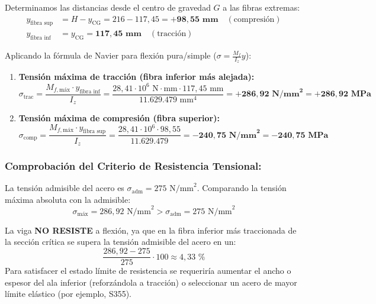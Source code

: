 Determinamos las distancias desde el centro de gravedad $G$ a las fibras extremas:
\begin{align}
    y_{\text{fibra sup}} & = H - y_{\text{CG}} = 216 - 117{,}45 = \mathbf{+98{,}55\text{ mm}} \quad (\text{compresión}) \\[4pt]
    y_{\text{fibra inf}} & = y_{\text{CG}} = \mathbf{117{,}45\text{ mm}} \quad (\text{tracción})
\end{align}

Aplicando la fórmula de Navier para flexión pura/simple ($\sigma = \frac{M_f}{I_z}y$):
\begin{enumerate}
    \item \textbf{Tensión máxima de tracción (fibra inferior más alejada):}
          \begin{equation}
              \sigma_{\text{trac}} = \frac{M_{f,\text{máx}} \cdot y_{\text{fibra inf}}}{I_z} = \frac{28{,}41 \cdot 10^6\text{ N}\cdot\text{mm} \cdot 117{,}45\text{ mm}}{11.629.479\text{ mm}^4} = \mathbf{+286{,}92\text{ N/mm}^2 = +286{,}92\text{ MPa}}
          \end{equation}
    \item \textbf{Tensión máxima de compresión (fibra superior):}
          \begin{equation}
              \sigma_{\text{comp}} = \frac{M_{f,\text{máx}} \cdot y_{\text{fibra sup}}}{I_z} = \frac{28{,}41 \cdot 10^6 \cdot 98{,}55}{11.629.479} = \mathbf{-240{,}75\text{ N/mm}^2 = -240{,}75\text{ MPa}}
          \end{equation}
\end{enumerate}

\subsubsection*{Comprobación del Criterio de Resistencia Tensional:}
La tensión admisible del acero es $\sigma_{\text{adm}} = 275\text{ N/mm}^2$.
Comparando la tensión máxima absoluta con la admisible:
\begin{equation}
    \sigma_{\text{máx}} = 286{,}92\text{ N/mm}^2 > \sigma_{\text{adm}} = 275\text{ N/mm}^2
\end{equation}
\begin{tcolorbox}[colback=red!10!white,colframe=red!80!black,title=\textbf{Conclusión de Resistencia}]
    La viga \textbf{NO RESISTE} a flexión, ya que en la fibra inferior más traccionada de la sección crítica se supera la tensión admisible del acero en un:
    \[
        \frac{286{,}92 - 275}{275} \cdot 100 \approx 4{,}33\text{ \%}
    \]
    Para satisfacer el estado límite de resistencia se requeriría aumentar el ancho o espesor del ala inferior (reforzándola a tracción) o seleccionar un acero de mayor límite elástico (por ejemplo, S355).
\end{tcolorbox}

